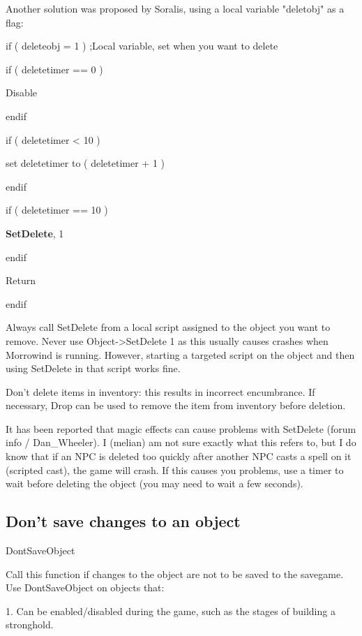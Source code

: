 

Another solution was proposed by Soralis, using a local variable
"deletobj" as a flag:

if ( deleteobj = 1 ) ;Local variable, set when you want to delete

if ( deletetimer == 0 )

Disable

endif

if ( deletetimer \textless{} 10 )

set deletetimer to ( deletetimer + 1 )

endif

if ( deletetimer == 10 )

\textbf{SetDelete}, 1

endif

Return

endif

Always call SetDelete from a local script assigned to the object you
want to remove. Never use Object-\textgreater SetDelete 1 as this
usually causes crashes when Morrowind is running. However, starting a
targeted script on the object and then using SetDelete in that script
works fine.

Don't delete items in inventory: this results in incorrect encumbrance.
If necessary, Drop can be used to remove the item from inventory before
deletion.

It has been reported that magic effects can cause problems with
SetDelete (forum info / Dan\_Wheeler). I (melian) am not sure exactly
what this refers to, but I do know that if an NPC is deleted too quickly
after another NPC casts a spell on it (scripted cast), the game will
crash. If this causes you problems, use a timer to wait before deleting
the object (you may need to wait a few seconds).

\hypertarget{dont-save-changes-to-an-object}{%
\subsection{\texorpdfstring{\hfill\break
Don't save changes to an
object}{ Don't save changes to an object}}\label{dont-save-changes-to-an-object}}

DontSaveObject

Call this function if changes to the object are not to be saved to the
savegame.\\
Use DontSaveObject on objects that:

1. Can be enabled/disabled during the game, such as the stages of
building a stronghold.

